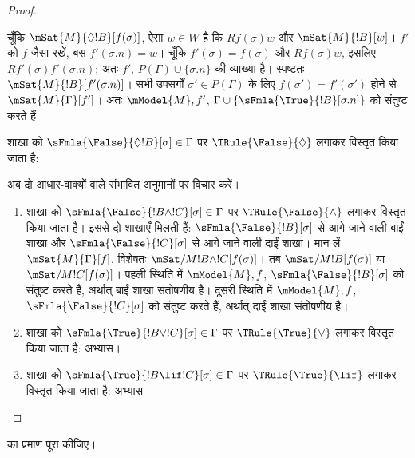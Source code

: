 \documentclass[../../../include/open-logic-section]{subfiles}
\begin{document}
\begin{proof}
\begin{enumerate}
{{  चूँकि $\mSat{M}{\Diamond !B}[f(\sigma)]$, ऐसा $w \in W$ है कि
  $Rf(\sigma)w$ और $\mSat{M}{!B}[w]$। $f'$ को $f$ जैसा रखें, बस
  $f'(\sigma.n) = w$। चूँकि $f'(\sigma) = f(\sigma)$ और
  $Rf(\sigma)w$, इसलिए $Rf'(\sigma)f'(\sigma.n)$; अतः $f'$,
  $P(\Gamma) \cup \{\sigma.n\}$ की व्याख्या है। स्पष्टतः
  $\mSat{M}{!B}[f'(\sigma.n)]$। सभी उपसर्गों $\sigma' \in P(\Gamma)$
  के लिए $f(\sigma') = f'(\sigma')$ होने से
  $\mSat{M}{\Gamma}[f']$। अतः $\mModel{M}, f'$, $\Gamma \cup
  \{\sFmla{\True}{!B}[\sigma.n]\}$ को संतुष्ट करते हैं।}
\item शाखा को $\sFmla{\False}{\Diamond !B}[\sigma] \in \Gamma$ पर
  $\TRule{\False}{\Diamond}$ लगाकर विस्तृत किया जाता है:
  }{}
\end{enumerate}
अब दो आधार-वाक्यों वाले संभावित अनुमानों पर विचार करें।
\begin{enumerate}
\item शाखा को $\sFmla{\False}{!B \land !C}[\sigma] \in \Gamma$ पर
  $\TRule{\False}{\land}$ लगाकर विस्तृत किया जाता है। इससे दो शाखाएँ
  मिलती हैं: $\sFmla{\False}{!B}[\sigma]$ से आगे जाने वाली बाईं शाखा और
  $\sFmla{\False}{!C}[\sigma]$ से आगे जाने वाली दाईं शाखा। मान लें
  $\mSat{M}{\Gamma}[f]$, विशेषतः
  $\mSat/{M}{!B \land !C}[f(\sigma)]$। तब
  $\mSat/{M}{!B}[f(\sigma)]$ या $\mSat/{M}{!C}[f(\sigma)]$। पहली स्थिति
  में $\mModel{M}, f$, $\sFmla{\False}{!B}[\sigma]$ को संतुष्ट करते हैं,
  अर्थात् बाईं शाखा संतोषणीय है। दूसरी स्थिति में $\mModel{M}, f$,
  $\sFmla{\False}{!C}[\sigma]$ को संतुष्ट करते हैं, अर्थात् दाईं शाखा
  संतोषणीय है।
\item शाखा को $\sFmla{\True}{!B \lor !C}[\sigma] \in \Gamma$ पर
    $\TRule{\True}{\lor}$ लगाकर विस्तृत किया जाता है: अभ्यास।
\item शाखा को $\sFmla{\True}{!B \lif !C}[\sigma] \in \Gamma$ पर
    $\TRule{\True}{\lif}$ लगाकर विस्तृत किया जाता है: अभ्यास।
\end{enumerate}
\end{proof}

\begin{prob}
 का प्रमाण पूरा कीजिए।
\end{prob}
\end{document}
